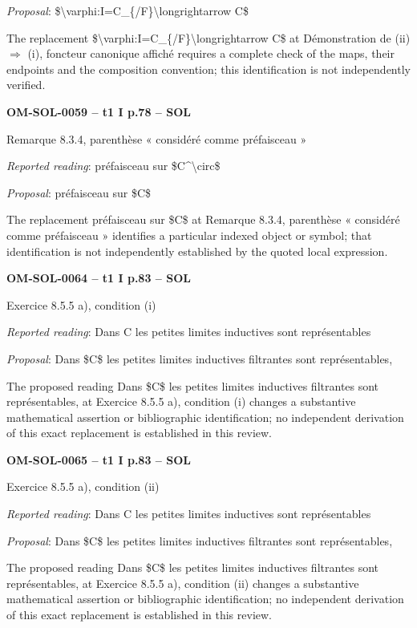 \emph{Proposal}: \$\textbackslash{}varphi:I=\allowbreak C\_\{/F\}\textbackslash{}longrightarrow C\$\par
The replacement \$\textbackslash{}varphi:I=\allowbreak C\_\{/F\}\textbackslash{}longrightarrow C\$ at Démonstration de (ii) \ensuremath{\Rightarrow} (i), foncteur canonique affiché requires a complete check of the maps, their endpoints and the composition convention; this identification is not independently verified.\par
\par\noindent\textbf{OM-SOL-0059 -- t1 I p.78 -- SOL}\par
Remarque 8.3.4, parenthèse « considéré comme préfaisceau »\par
\emph{Reported reading}: préfaisceau sur \$C\textasciicircum{}\textbackslash{}circ\$\par
\emph{Proposal}: préfaisceau sur \$C\$\par
The replacement préfaisceau sur \$C\$ at Remarque 8.3.4, parenthèse « considéré comme préfaisceau » identifies a particular indexed object or symbol; that identification is not independently established by the quoted local expression.\par
\par\noindent\textbf{OM-SOL-0064 -- t1 I p.83 -- SOL}\par
Exercice 8.5.5 a), condition (i)\par
\emph{Reported reading}: Dans C les petites limites inductives sont représentables\par
\emph{Proposal}: Dans \$C\$ les petites limites inductives filtrantes sont représentables,\par
The proposed reading Dans \$C\$ les petites limites inductives filtrantes sont représentables, at Exercice 8.5.5 a), condition (i) changes a substantive mathematical assertion or bibliographic identification; no independent derivation of this exact replacement is established in this review.\par
\par\noindent\textbf{OM-SOL-0065 -- t1 I p.83 -- SOL}\par
Exercice 8.5.5 a), condition (ii)\par
\emph{Reported reading}: Dans C les petites limites inductives sont représentables\par
\emph{Proposal}: Dans \$C\$ les petites limites inductives filtrantes sont représentables,\par
The proposed reading Dans \$C\$ les petites limites inductives filtrantes sont représentables, at Exercice 8.5.5 a), condition (ii) changes a substantive mathematical assertion or bibliographic identification; no independent derivation of this exact replacement is established in this review.\par
